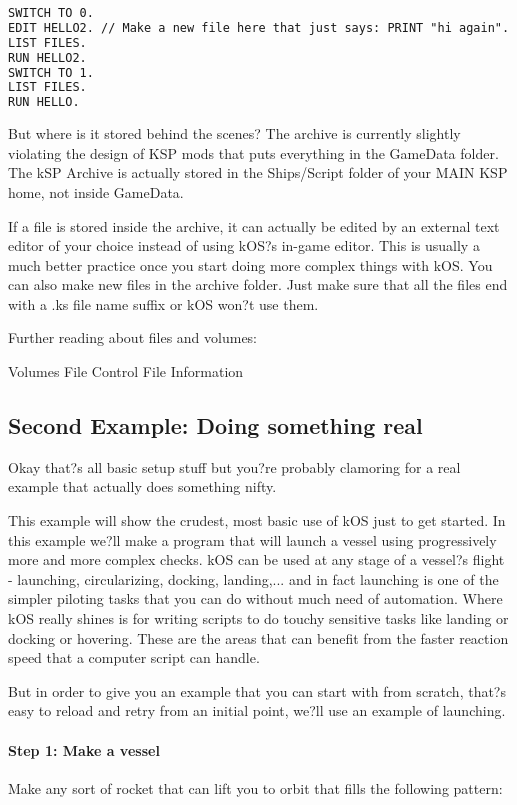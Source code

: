 \begin{lstlisting}[frame=single,language=XML]
SWITCH TO 0.
EDIT HELLO2. // Make a new file here that just says: PRINT "hi again".
LIST FILES.
RUN HELLO2.
SWITCH TO 1.
LIST FILES.
RUN HELLO.
\end{lstlisting} 

But where is it stored behind the scenes? The archive is currently slightly violating the design of KSP mods that puts everything in the GameData folder. The kSP Archive is actually stored in the Ships/Script folder of your MAIN KSP home, not inside GameData.

If a file is stored inside the archive, it can actually be edited by an external text editor of your choice instead of using kOS?s in-game editor. This is usually a much better practice once you start doing more complex things with kOS. You can also make new files in the archive folder. Just make sure that all the files end with a .ks file name suffix or kOS won?t use them.	

Further reading about files and volumes:

Volumes
File Control
File Information		
		\subsection{Second Example: Doing something real}%
Okay that?s all basic setup stuff but you?re probably clamoring for a real example that actually does something nifty.

This example will show the crudest, most basic use of kOS just to get started. In this example we?ll make a program that will launch a vessel using progressively more and more complex checks. kOS can be used at any stage of a vessel?s flight - launching, circularizing, docking, landing,... and in fact launching is one of the simpler piloting tasks that you can do without much need of automation. Where kOS really shines is for writing scripts to do touchy sensitive tasks like landing or docking or hovering. These are the areas that can benefit from the faster reaction speed that a computer script can handle.

But in order to give you an example that you can start with from scratch, that?s easy to reload and retry from an initial point, we?ll use an example of launching.

\paragraph{Step 1: Make a vessel}
Make any sort of rocket that can lift you to orbit that fills the following pattern:

